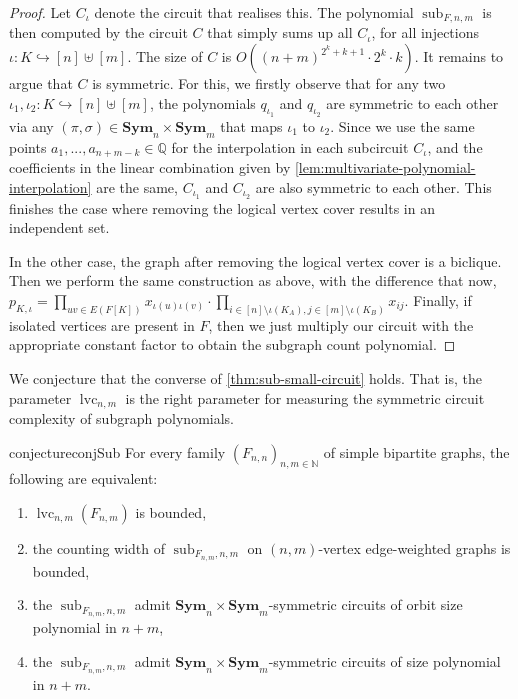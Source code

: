 \documentclass[11pt, DIV=15]{scrarticle}
\theoremstyle{definition}
\theoremstyle{plain}
\theoremstyle{remark}
\DeclareMathOperator{\sub}{sub}
\DeclareMathOperator{\cc}{lvc}
\newcommand{\Sym}{\mathbf{Sym}}
\newcommand{\bbQ}{\mathbb{Q}}
\begin{document}
\begin{proof}
		Let $C_{\iota}$ denote the circuit that realises this. The polynomial $\sub_{F,n,m}$ is then computed by the circuit $C$ that simply sums up all $C_{\iota}$, for all injections $\iota: K \hookrightarrow [n] \uplus [m]$. The size of $C$ is $O((n+m)^{2^k+k+1} \cdot 2^k \cdot k)$. It remains to argue that $C$ is symmetric. 
		For this, we firstly observe that for any two $\iota_1, \iota_2 \colon K \hookrightarrow [n] \uplus [m]$, the polynomials $q_{\iota_1}$ and $q_{\iota_2}$ are symmetric to each other via any $(\pi, \sigma) \in \Sym_n \times \Sym_m$ that maps $\iota_1$ to $\iota_2$. Since we use the same points $a_1,...,a_{n+m-k} \in \bbQ$ for the interpolation in each subcircuit $C_{\iota}$, and the coefficients in the linear combination given by \cref{lem:multivariate-polynomial-interpolation} are the same, $C_{\iota_1}$ and $C_{\iota_2}$ are also symmetric to each other. This finishes the case where removing the logical vertex cover results in an independent set. 
		
		In the other case, the graph after removing the logical vertex cover is a biclique.
		Then we perform the same construction as above, with the difference that now, $p_{K,\iota} = \prod_{uv \in E(F[K])} x_{\iota(u)\iota(v)} \cdot \prod_{i \in [n] \setminus \iota(K_A), j\in [m] \setminus \iota(K_B)} x_{ij}$.
		Finally, if isolated vertices are present in $F$, then we just multiply our circuit with the appropriate constant factor to obtain the subgraph count polynomial.
	\end{proof}	
	
	We conjecture that the converse of \cref{thm:sub-small-circuit} holds.
	That is, the parameter $\cc_{n,m}$ is the right parameter for measuring the symmetric circuit complexity of subgraph polynomials.
	\begin{restatable}{conjecture}{conjSub}\label{conj:sub}
		For every family $(F_{n,n})_{n,m \in \mathbb{N}}$ of simple bipartite graphs,
		the following are equivalent:
		\begin{enumerate}
			\item $\cc_{n,m}(F_{n,m})$ is bounded,\label{it:subconj1}
			\item the counting width of $\sub_{F_{n,m},n,m}$ on $(n,m)$-vertex edge-weighted graphs is bounded,\label{it:subconj2}
			\item the $\sub_{F_{n,m}, n, m}$ admit $\Sym_n \times \Sym_m$-symmetric circuits of orbit size polynomial in $n+m$,\label{it:subconj3}
			\item the $\sub_{F_{n,m}, n, m}$ admit $\Sym_n \times \Sym_m$-symmetric circuits of size polynomial in $n+m$.\label{it:subconj4}
		\end{enumerate}
	\end{restatable}
	
\end{document}
